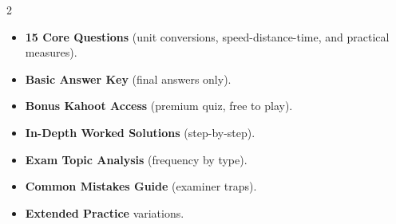 \documentclass[11pt,a4paper]{article}
\newcommand{\FullReleaseDate}{April 30, 2026}
\begin{document}
\vspace{8pt}

\begin{multicols}{2}
  \begin{tcolorbox}[card, title=\sffamily\bfseries\textcolor{white}{\faHandPointDown\ TODAY (Simplified Version)}, colbacktitle=mainblue, boxed title style={sharp corners, boxrule=0pt}]
    \begin{itemize}[leftmargin=1.2em, itemsep=2pt]
      \item \small \textbf{15 Core Questions} (unit conversions, speed-distance-time, and practical measures).
      \item \small \textbf{Basic Answer Key} (final answers only).
      \item \small \textbf{Bonus Kahoot Access} (premium quiz, free to play).
    \end{itemize}
  \end{tcolorbox}

  \columnbreak

  \begin{tcolorbox}[card, title=\sffamily\bfseries\textcolor{white}{\faRocket\ ON \FullReleaseDate\ (Full Upgrade)}, colbacktitle=mainblue, boxed title style={sharp corners, boxrule=0pt}]
    \begin{itemize}[leftmargin=1.2em, itemsep=2pt]
      \item \small \textbf{In-Depth Worked Solutions} (step-by-step).
      \item \small \textbf{Exam Topic Analysis} (frequency by type).
      \item \small \textbf{Common Mistakes Guide} (examiner traps).
      \item \small \textbf{Extended Practice} variations.
    \end{itemize}
  \end{tcolorbox}
\end{multicols}
\end{document}
